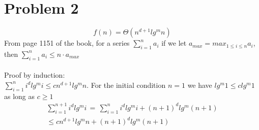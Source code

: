 \documentclass{article}
\begin{document}
\section*{Problem 2}
$$f(n)=\Theta(n^{d+1}lg^mn)$$
From page 1151 of the book, for a series $\sum_{i=1}^na_i$ if we let $a_{max}=max_{1\leq i \leq n}a_i$, then $\sum_{i=1}^na_i \leq n \cdot a_{max}$\\\\
Proof by induction:\\
$\sum_{i=1}^ni^dlg^mi\leq cn^{d+1}lg^mn$. For the initial condition $n=1$ we have $lg^m1 \leq clg^m1$ as long as $c \geq 1$\\
\begin{equation}
\begin{split}
\sum_{i=1}^{n+1}i^dlg^mi\,=\,\sum_{i=1}^ni^dlg^mi + (n+1)^dlg^m(n+1)\\
\leq cn^{d+1}lg^mn + (n+1)^dlg^m(n+1)
\end{split}
\end{equation}
\end{document}
